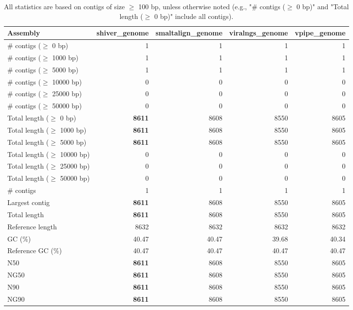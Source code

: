 \documentclass[12pt,a4paper]{article}
\begin{document}
\begin{table}[ht]
\begin{center}
\caption{All statistics are based on contigs of size $\geq$ 100 bp, unless otherwise noted (e.g., "\# contigs ($\geq$ 0 bp)" and "Total length ($\geq$ 0 bp)" include all contigs).}
\begin{tabular}{|l*{4}{|r}|}
\hline
Assembly & shiver\_genome & smaltalign\_genome & viralngs\_genome & vpipe\_genome \\ \hline
\# contigs ($\geq$ 0 bp) & 1 & 1 & 1 & 1 \\ \hline
\# contigs ($\geq$ 1000 bp) & 1 & 1 & 1 & 1 \\ \hline
\# contigs ($\geq$ 5000 bp) & 1 & 1 & 1 & 1 \\ \hline
\# contigs ($\geq$ 10000 bp) & 0 & 0 & 0 & 0 \\ \hline
\# contigs ($\geq$ 25000 bp) & 0 & 0 & 0 & 0 \\ \hline
\# contigs ($\geq$ 50000 bp) & 0 & 0 & 0 & 0 \\ \hline
Total length ($\geq$ 0 bp) & {\bf 8611} & 8608 & 8550 & 8605 \\ \hline
Total length ($\geq$ 1000 bp) & {\bf 8611} & 8608 & 8550 & 8605 \\ \hline
Total length ($\geq$ 5000 bp) & {\bf 8611} & 8608 & 8550 & 8605 \\ \hline
Total length ($\geq$ 10000 bp) & 0 & 0 & 0 & 0 \\ \hline
Total length ($\geq$ 25000 bp) & 0 & 0 & 0 & 0 \\ \hline
Total length ($\geq$ 50000 bp) & 0 & 0 & 0 & 0 \\ \hline
\# contigs & 1 & 1 & 1 & 1 \\ \hline
Largest contig & {\bf 8611} & 8608 & 8550 & 8605 \\ \hline
Total length & {\bf 8611} & 8608 & 8550 & 8605 \\ \hline
Reference length & 8632 & 8632 & 8632 & 8632 \\ \hline
GC (\%) & 40.47 & 40.47 & 39.68 & 40.34 \\ \hline
Reference GC (\%) & 40.47 & 40.47 & 40.47 & 40.47 \\ \hline
N50 & {\bf 8611} & 8608 & 8550 & 8605 \\ \hline
NG50 & {\bf 8611} & 8608 & 8550 & 8605 \\ \hline
N90 & {\bf 8611} & 8608 & 8550 & 8605 \\ \hline
NG90 & {\bf 8611} & 8608 & 8550 & 8605 \\ \hline

\end{tabular}
\end{center}
\end{table}
\end{document}

